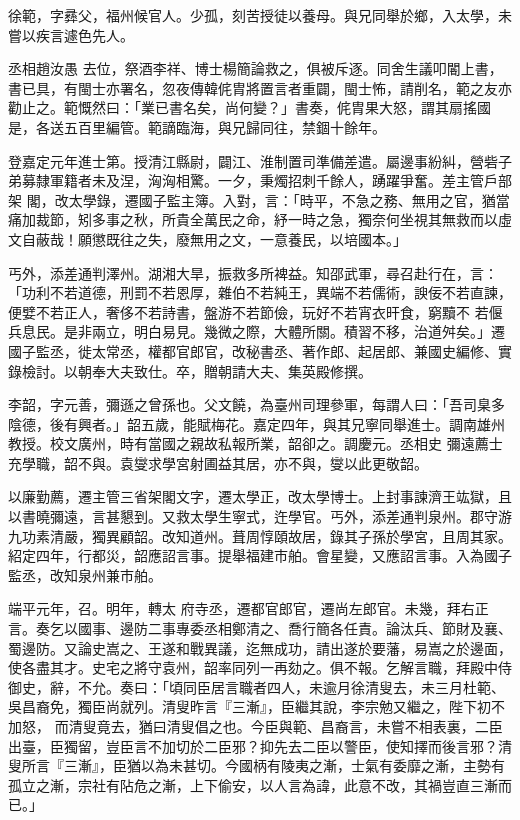 \begin{pinyinscope}
 徐範，字彞父，福州候官人。少孤，刻苦授徒以養母。與兄同舉於鄉，入太學，未嘗以疾言遽色先人。



 丞相趙汝愚
 去位，祭酒李祥、博士楊簡論救之，俱被斥逐。同舍生議叩閽上書，書已具，有閩士亦署名，忽夜傳韓侂胄將置言者重闢，閩士怖，請削名，範之友亦勸止之。範慨然曰：「業已書名矣，尚何變？」書奏，侂胄果大怒，謂其扇搖國是，各送五百里編管。範謫臨海，與兄歸同往，禁錮十餘年。



 登嘉定元年進士第。授清江縣尉，闢江、淮制置司準備差遣。屬邊事紛糾，營砦子弟募隸軍籍者未及涅，洶洶相驚。一夕，秉燭招刺千餘人，踴躍爭奮。差主管戶部架
 閣，改太學錄，遷國子監主簿。入對，言：「時平，不急之務、無用之官，猶當痛加裁節，矧多事之秋，所貴全萬民之命，紓一時之急，獨奈何坐視其無救而以虛文自蔽哉！願懲既往之失，廢無用之文，一意養民，以培國本。」



 丐外，添差通判澤州。湖湘大旱，振救多所裨益。知邵武軍，尋召赴行在，言：「功利不若道德，刑罰不若恩厚，雜伯不若純王，異端不若儒術，諛佞不若直諫，便嬖不若正人，奢侈不若詩書，盤游不若節儉，玩好不若宵衣旰食，窮黷不
 若偃兵息民。是非兩立，明白易見。幾微之際，大體所關。積習不移，治道舛矣。」遷國子監丞，徙太常丞，權都官郎官，改秘書丞、著作郎、起居郎、兼國史編修、實錄檢討。以朝奉大夫致仕。卒，贈朝請大夫、集英殿修撰。



 李韶，字元善，彌遜之曾孫也。父文饒，為臺州司理參軍，每謂人曰：「吾司臬多陰德，後有興者。」韶五歲，能賦梅花。嘉定四年，與其兄寧同舉進士。調南雄州教授。校文廣州，時有當國之親故私報所業，韶卻之。調慶元。丞相史
 彌遠薦士充學職，韶不與。袁燮求學宮射圃益其居，亦不與，燮以此更敬韶。



 以廉勤薦，遷主管三省架閣文字，遷太學正，改太學博士。上封事諫濟王竑獄，且以書曉彌遠，言甚懇到。又救太學生寧式，迕學官。丐外，添差通判泉州。郡守游九功素清嚴，獨異顧韶。改知道州。葺周惇頤故居，錄其子孫於學宮，且周其家。紹定四年，行都災，韶應詔言事。提舉福建市舶。會星變，又應詔言事。入為國子監丞，改知泉州兼市舶。



 端平元年，召。明年，轉太
 府寺丞，遷都官郎官，遷尚左郎官。未幾，拜右正言。奏乞以國事、邊防二事專委丞相鄭清之、喬行簡各任責。論汰兵、節財及襄、蜀邊防。又論史嵩之、王遂和戰異議，迄無成功，請出遂於要藩，易嵩之於邊面，使各盡其才。史宅之將守袁州，韶率同列一再劾之。俱不報。乞解言職，拜殿中侍御史，辭，不允。奏曰：「頃同臣居言職者四人，未逾月徐清叟去，未三月杜範、吳昌裔免，獨臣尚就列。清叟昨言『三漸』，臣繼其說，李宗勉又繼之，陛下初不加怒，
 而清叟竟去，猶曰清叟倡之也。今臣與範、昌裔言，未嘗不相表裏，二臣出臺，臣獨留，豈臣言不加切於二臣邪？抑先去二臣以警臣，使知擇而後言邪？清叟所言『三漸』，臣猶以為未甚切。今國柄有陵夷之漸，士氣有委靡之漸，主勢有孤立之漸，宗社有阽危之漸，上下偷安，以人言為諱，此意不改，其禍豈直三漸而已。」




\end{pinyinscope}
